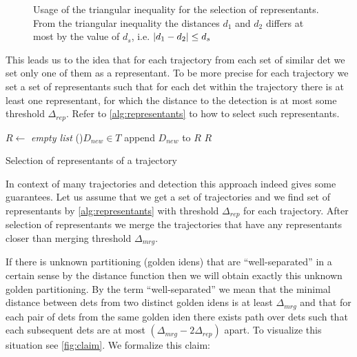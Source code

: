 \begin{figure}
    \centering
    \def\svgwidth{\columnwidth}
    \scalebox{0.6}{}
    \caption[Usage of triangular inequality for the selection of representants]{Usage of the triangular inequality for the selection of representants. From the triangular inequality the distances $d_1$ and $d_2$ differs at most by the value of $d_s$, i.e. $\left|{d_1 - d_2}\right| \leq d_s$}
    \label{fig:triangular}
\end{figure}

This leads us to the idea that for each trajectory from each set of similar \gls{det} we set only one of them as a representant. To be more precise for each trajectory we set a set of representants such that for each \gls{det} within the trajectory there is at least one representant, for which the distance to the detection is at most some threshold $\Delta_{rep}$. Refer to \autoref{alg:representants} to how to select such representants.

\begin{algorithm}

 
 \BlankLine
 $R \leftarrow$ \emph{empty list}\;
 \For(){$D_{new} \in T$}{
  append $D_{new}$ to $R$\;
 }
 \Return $R$
 \caption{Selection of representants of a trajectory}
 \label{alg:representants}
\end{algorithm}

In context of many trajectories and detection this approach indeed gives some guarantees. Let us assume that we get a set of trajectories and we find set of representants by \autoref{alg:representants} with threshold $\Delta_{rep}$ for each trajectory. After selection of representants we merge the trajectories that have any representants closer than merging threshold $\Delta_{mrg}$.

If there is unknown partitioning (golden \glspl{iden}) that are ``well-separated'' in a certain sense by the distance function then we will obtain exactly this unknown golden partitioning. By the term ``well-separated'' we mean that the minimal distance between \glspl{det} from two distinct golden \glspl{iden} is at least $\Delta_{mrg}$ and that for each pair of \glspl{det} from the same golden \gls{iden} there exists path over \glspl{det} such that each subsequent \glspl{det} are at most $(\Delta_{mrg} - 2\Delta_{rep})$ apart. To visualize this situation see \autoref{fig:claim}. We formalize this claim:

